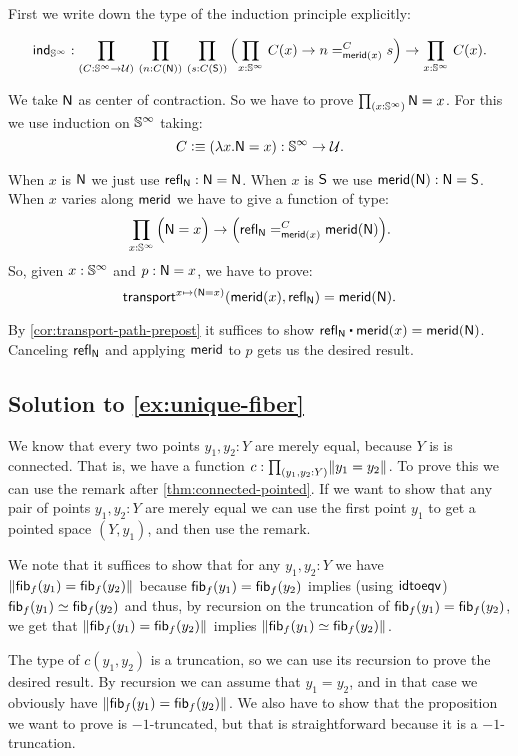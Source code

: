 \documentclass[
%
%
11pt %
]{article}
\begin{document}
First we write down the type of the induction principle explicitly:

\[ \ind{\Sn^\infty} : \prd{C:\Sn^\infty \to \UU}{n:C(\north)}{s:C(\south)}
  \Parens{\prd{x:\Sn^\infty} C(x) \to \dpath C {\merid(x)} {n}{s}} \to \prd{x:\Sn^\infty} C(x) . \]

  We take $\mathsf{N}$ as center of contraction. So we have to prove
  $\prd{x:\Sn^\infty} \north = x$. For this we use induction on $\mathbb{S}^\infty$ taking:
\[C \vcentcolon\equiv (\lambda x. \mathsf{N} = x) : \mathbb{S}^\infty \to \mathcal{U} .\]

  When $x$ is $\mathsf{N}$ we just use $\mathsf{refl}_{\mathsf{N}} : \mathsf{N} = \mathsf{N}$. When $x$
  is $\mathsf{S}$ we use $\mathsf{merid}(\mathsf{N}) : \mathsf{N} = \mathsf{S}$.
  When $x$ varies along $\mathsf{merid}$ we have to give a function of type:
\[\prd{x:\Sn^\infty} \Parens{\north = x} \to \Parens{\dpath C {\merid(x)} {\refl{\north}}{\merid(\north)}}. \]
  So, given $x : \mathbb{S}^\infty$ and $p : \mathsf{N} = x$, we have to prove:
  \[\mathsf{transport}^{x \mapsto (\mathsf{N} = x)}(\mathsf{merid}(x),\mathsf{refl}_{\mathsf{N}}) = \mathsf{merid}(\mathsf{N}).\]

By \cref{cor:transport-path-prepost} it suffices to show
$\refl{\north}\ct \merid(x) = \merid(\north)$. Canceling $\mathsf{refl}_{\mathsf{N}}$ and
applying $\mathsf{merid}$ to $p$ gets us the desired result.

\subsection*{Solution to \cref{ex:unique-fiber}}

We know that every two points $y_1,y_2 : Y$ are merely equal, because $Y$ is
is connected. That is, we have a function
$c : \prd{y_1,y_2:Y}\trunc {} {y_1 = y_2}$. To prove this we can use the remark
after \cref{thm:connected-pointed}. If we want to show that any pair of
points $y_1,y_2 : Y$ are merely equal we can use the first point $y_1$ to get
a pointed space $(Y,y_1)$, and then use the remark.

We note that it suffices to show that for any $y_1,y_2:Y$ we have
$\mathopen{}\left\Vert {\mathsf{fib}}_{f}(y_1) = {\mathsf{fib}}_{f}(y_2)\right\Vert_{}\mathclose{}$ because
${\mathsf{fib}}_{f}(y_1) = {\mathsf{fib}}_{f}(y_2)$ implies (using $\mathsf{idtoeqv}$)
${\mathsf{fib}}_{f}(y_1)\simeq {\mathsf{fib}}_{f}(y_2)$
and thus, by recursion on the truncation of ${\mathsf{fib}}_{f}(y_1) = {\mathsf{fib}}_{f}(y_2)$,
we get that $\mathopen{}\left\Vert {\mathsf{fib}}_{f}(y_1) = {\mathsf{fib}}_{f}(y_2)\right\Vert_{}\mathclose{}$ implies
$\mathopen{}\left\Vert {\mathsf{fib}}_{f}(y_1) \simeq {\mathsf{fib}}_{f}(y_2)\right\Vert_{}\mathclose{}$.

The type of $c(y_1,y_2)$ is a truncation, so we can use its recursion to
prove the desired result.
By recursion we can assume that $y_1 = y_2$, and in that case we obviously have
$\mathopen{}\left\Vert {\mathsf{fib}}_{f}(y_1) = {\mathsf{fib}}_{f}(y_2)\right\Vert_{}\mathclose{}$. We also have to show that
the proposition we want to prove is $-1$-truncated, but that is straightforward
because it is a $-1$-truncation.
\end{document}
